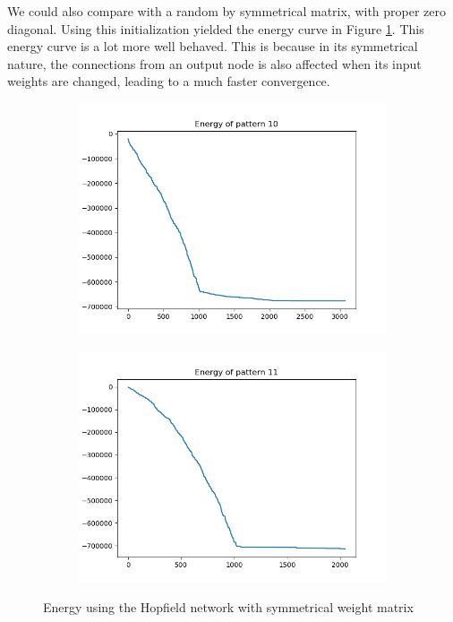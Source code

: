 \documentclass[a4paper]{article}
\begin{document}
We could also compare with a random by symmetrical matrix, with proper zero diagonal. Using this initialization yielded the energy curve in Figure \ref{fig:energysymmetric}. This energy curve is a lot more well behaved. This is because in its symmetrical nature, the connections from an output node is also affected when its input weights are changed, leading to a much faster convergence.
\begin{figure}[ht]
   \begin{subfigure}[b]{0.5\textwidth}
   \centering
   \includegraphics[width=\linewidth]{figures/ep10s.png}
   \end{subfigure}
  \begin{subfigure}[b]{0.5\textwidth}
   \centering
   \includegraphics[width=\linewidth]{figures/ep11s.png}
   \end{subfigure}
   \caption{Energy using the Hopfield network with symmetrical weight matrix}
   \label{fig:energysymmetric}
\end{figure}
\end{document}
